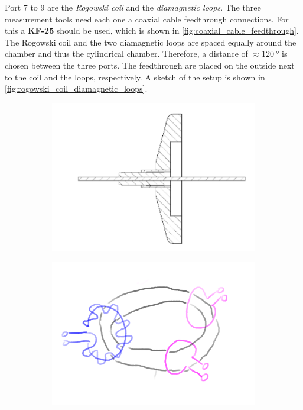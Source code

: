 Port 7 to 9 are the \emph{Rogowski coil} and the \emph{diamagnetic loops}.
The three measurement tools need each one a coaxial cable feedthrough connections.
For this a \textbf{KF-25} should be used, which is shown in \autoref{fig:coaxial_cable_feedthrough}.
The Rogowski coil and the two diamagnetic loops are spaced equally around the chamber and thus the cylindrical chamber.
Therefore, a distance of $\approx 120~\si{\degree}$ is chosen between the three ports.
The feedthrough are placed on the outside next to the coil and the loops, respectively.
A sketch of the setup is shown in \autoref{fig:rogowski_coil_diamagnetic_loops}.

\begin{figure}[H]
    \centering
    \begin{subfigure}{0.49\textwidth}
        \centering
        \includegraphics[width=1\textwidth]{sections/imges/ports/coaxial_feedthough.png}
        \label{fig:coaxial_cable_feedthrough}
    \end{subfigure}
    \hfill
    \begin{subfigure}{0.49\textwidth}
        \centering
        \includegraphics[width=1\textwidth]{sections/imges/ports/rogowski_coil_diamagnetx_loop.png}

\end{subfigure}
\end{figure}
